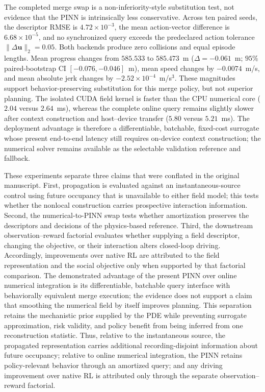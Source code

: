 The completed merge swap is a non-inferiority-style substitution test, not
evidence that the PINN is intrinsically less conservative. Across ten paired
seeds, the descriptor RMSE is $4.72\times10^{-3}$, the mean action-vector
difference is $6.68\times10^{-5}$, and no synchronized query exceeds the
predeclared action tolerance $\|\Delta\mathbf{u}\|_{2}=0.05$. Both backends
produce zero collisions and equal episode lengths. Mean progress changes from
$585.533$ to $585.473$~m ($\Delta=-0.061$~m; $95\%$ paired-bootstrap CI
$[-0.076,-0.046]$~m), mean speed changes by $-0.0074$~m/s, and mean absolute
jerk changes by $-2.52\times10^{-4}$~m/s$^{3}$. These magnitudes support
behavior-preserving substitution for this merge policy, but not superior
planning. The isolated CUDA field kernel is faster than the CPU numerical
core ($2.04$ versus $2.64$~ms), whereas the complete online query remains
slightly slower after context construction and host--device transfer
($5.80$ versus $5.21$~ms). The deployment advantage is therefore a
differentiable, batchable, fixed-cost surrogate whose present end-to-end
latency still requires on-device context construction; the numerical solver
remains available as the selectable validation reference and fallback.

These experiments separate three claims that were conflated in the original
manuscript. First, propagation is evaluated against an instantaneous-source
control using future occupancy that is unavailable to either field model;
this tests whether the nonlocal construction carries prospective interaction
information. Second, the numerical-to-PINN swap tests whether amortization
preserves the descriptors and decisions of the physics-based reference. Third,
the downstream observation--reward factorial evaluates whether supplying a
field descriptor, changing the objective, or their interaction alters
closed-loop driving. Accordingly, improvements over native RL are attributed
to the field representation and the social objective only when supported by
that factorial comparison. The demonstrated advantage of the present PINN over
online numerical integration is its differentiable, batchable query interface
with behaviorally equivalent merge execution; the evidence does not support a
claim that smoothing the numerical field by itself improves planning. This
separation retains the mechanistic prior supplied by the PDE while preventing
surrogate approximation, risk validity, and policy benefit from being inferred
from one reconstruction statistic. Thus, relative to the instantaneous source,
the propagated representation carries additional recording-disjoint
information about future occupancy; relative to online numerical integration,
the PINN retains policy-relevant behavior through an amortized query; and any
driving improvement over native RL is attributed only through the separate
observation--reward factorial.

